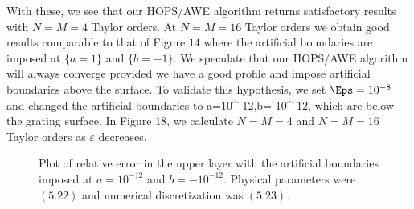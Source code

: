 \vspace{-14mm}
With these, we see that our HOPS/AWE algorithm returns satisfactory results with $N=M=4$ Taylor orders. At $N=M=16$ Taylor orders we obtain good results comparable to that of Figure $14$ where the artificial boundaries are imposed at $\{a=1\}$ and $\{b=-1\}$. We speculate that our HOPS/AWE algorithm will always converge provided we have a good profile and impose artificial boundaries above the surface. To validate this hypothesis, we set $\Eps = 10^{-8}$ and changed the artificial boundaries to
\bes
a=10^{-12},\quad b=-10^{-12},   
\ees
which are below the grating surface. In Figure $18$, we calculate $N=M=4$ and $N=M=16$ Taylor orders as $\varepsilon$ decreases.
\vspace{-17mm}
\begin{figure}[H]
\vspace{3mm}
\caption{Plot of relative error in the upper layer with the artificial boundaries imposed at $a=10^{-12}$ and $b=-10^{-12}$. Physical parameters were $(5.22)$ and numerical discretization was $(5.23)$.}
\label{Fig:Eps}
\end{figure}
